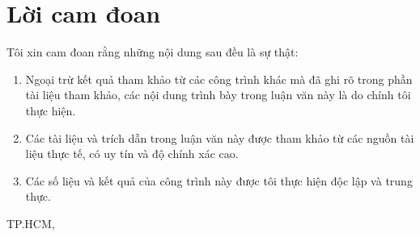 \chapter*{Lời cam đoan}
Tôi xin cam đoan rằng những nội dung sau đều là sự thật:

\begin{enumerate}
    \item Ngoại trừ kết quả tham khảo từ các công trình khác mà đã ghi rõ trong phần tài liệu tham khảo, các nội dung trình bày trong luận văn này là do chính tôi thực hiện.

    \item Các tài liệu và trích dẫn trong luận văn này được tham khảo từ các nguồn tài liệu thực tế, có uy tín và độ chính xác cao.

    \item Các số liệu và kết quả của công trình này được tôi thực hiện độc lập và trung thực.
\end{enumerate}

\bigskip
\bigskip

\begin{flushright}
TP.HCM, \csCompileTime

\bigskip
\bigskip
\bigskip
\bigskip

\csSVone
\end{flushright}
